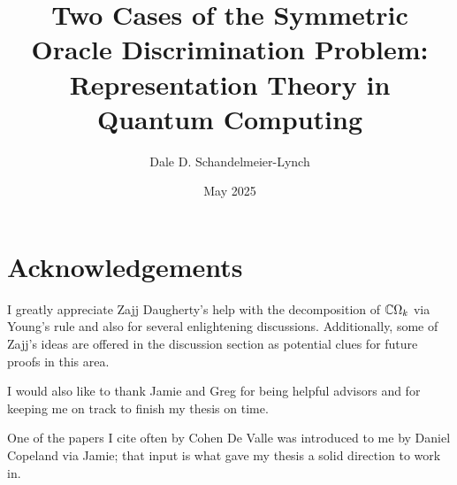 \documentclass[12pt,twoside]{reedthesis}
\title{Two Cases of the Symmetric Oracle Discrimination Problem: Representation Theory in Quantum Computing}
\author{Dale D. Schandelmeier-Lynch}
\date{May 2025}
\theoremstyle{plain}   %
\theoremstyle{definition}
\theoremstyle{remark}
\numberwithin{equation}{section}
\begin{document}
  \maketitle
  \frontmatter %
  \pagestyle{empty} %

  \chapter*{Acknowledgements}

  I greatly appreciate Zajj Daugherty's help with the decomposition of $\mathbb{C} \Omega_k$ via Young's rule and also for several enlightening discussions.
  Additionally, some of Zajj's ideas are offered in the discussion section as potential clues for future proofs in this area.
  
  \bigskip
  I would also like to thank Jamie and Greg for being helpful advisors and for keeping me on track to finish my thesis on time.
  
  \bigskip
  One of the papers I cite often by Cohen De Valle was introduced to me by Daniel Copeland via Jamie; that input is what gave my thesis a solid direction to work in.




\end{document}
